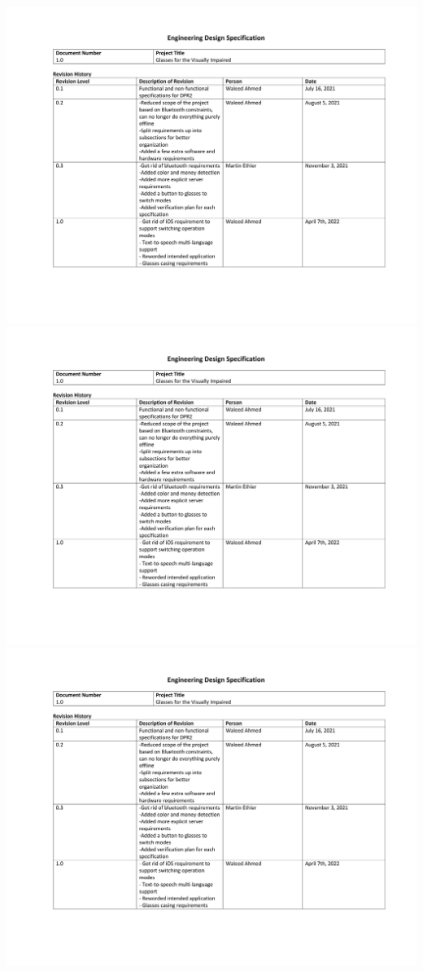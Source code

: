 \documentclass[a4paper,11pt]{article}
\begin{document}
\begin{landscape}
\begin{center}
        \includegraphics[page=3,width={0.86\linewidth}]{pdf/eds_1.0.pdf}
        \newpage
        \includegraphics[page=4,width={0.86\linewidth}]{pdf/eds_1.0.pdf}
        \newpage
        \includegraphics[page=5,width={0.86\linewidth}]{pdf/eds_1.0.pdf}

\end{center}
\end{landscape}
\end{document}
